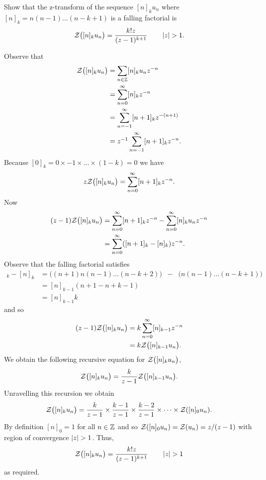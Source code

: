 \begin{excersizelist}
\item \label{exer:fallingfacztransform} Show that the z-transform of the sequence $[n]_k u_n$ where $[n]_k = n(n-1)\dots(n-k+1)$ is a falling factorial is
\[
{\mathcal Z}\big( [n]_k u_n  \big) = \frac{k! z }{(z - 1)^{k+1}} \qquad \left\vert z \right\vert > 1.
\]
\begin{solution}
Observe that
\begin{align*}
{\mathcal Z}\big( [n]_{k} u_n  \big) &= \sum_{n\in{\mathbb Z}} [n]_k u_n z^{-n} \\ 
&= \sum_{n=0}^\infty [n]_k z^{-n} \\ 
&= \sum_{n=-1}^\infty [n+1]_k z^{-(n+1)} \\
&= z^{-1} \sum_{n=-1}^\infty [n+1]_k z^{-n}.
\end{align*}
Because $[0]_k = 0 \times -1 \times \dots \times (1-k)= 0$ we have
\[
z {\mathcal Z}\big( [n]_{k} u_n  \big) = \sum_{n=0}^\infty [n+1]_k z^{-n}.
\]  
Now
\begin{align*}
(z - 1) {\mathcal Z}\big( [n]_{k} u_n  \big) &= \sum_{n=0}^\infty [n+1]_k z^{-n} - \sum_{n=0}^\infty [n]_k u_n z^{-n} \\
&= \sum_{n=0}^\infty ([n+1]_k - [n]_k) z^{-n}.
\end{align*}
Observe that the falling factorial satisfies
\begin{align*}
[n+1]_k - [n]_k &= \big( (n+1)n(n-1)\dots(n-k+2) \big) \;\;  - \;\; \big(n(n-1)\dots(n-k+1)\big) \\
&= [n]_{k-1}(n+1 - n+k-1) \\
&= [n]_{k-1} k
\end{align*}
and so
\begin{align*}
(z - 1) {\mathcal Z}\big( [n]_{k} u_n  \big) &= k \sum_{n=0}^\infty  [n]_{k-1} z^{-n} \\
&= k {\mathcal Z}\big( [n]_{k-1} u_n  \big).
\end{align*}
We obtain the following recursive equation for ${\mathcal Z}\big( [n]_{k} u_n  \big)$,
\[
{\mathcal Z}\big( [n]_{k} u_n  \big) = \frac{k}{z-1} {\mathcal Z}\big( [n]_{k-1} u_n  \big).
\]
Unravelling this recursion we obtain
\[
{\mathcal Z}\big( [n]_{k} u_n  \big) = \frac{k}{z-1} \times \frac{k-1}{z-1} \times \frac{k-2}{z-1} \times \dots \times {\mathcal Z}( [n]_0 u_n ).
\]
By definition $[n]_0 = 1$ for all $n \in {\mathbb Z}$ and so ${\mathcal Z}( [n]_0 u_n ) = {\mathcal Z}( u_n ) = z/(z-1)$ with region of convergence $\left\vert z \right\vert >1$.  Thus,
\[
{\mathcal Z}\big( [n]_{k} u_n  \big) = \frac{k! z}{(z-1)^{k+1}} \qquad \left\vert z \right\vert > 1
\]
as required.
\end{solution}


\end{excersizelist}
